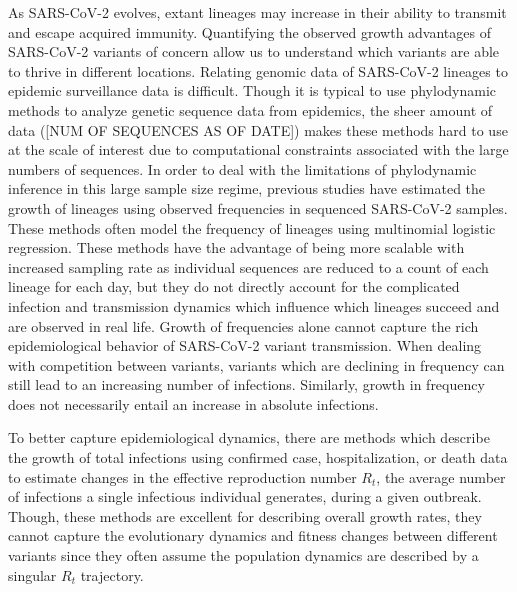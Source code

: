 \documentclass[12pt]{article}
\begin{document}
As SARS-CoV-2 evolves, extant lineages may increase in their ability to transmit and escape acquired immunity. %
Quantifying the observed growth advantages of SARS-CoV-2 variants of concern allow us to understand which variants are able to thrive in different locations.
Relating genomic data of SARS-CoV-2 lineages to epidemic surveillance data is difficult.
Though it is typical to use phylodynamic methods to analyze genetic sequence data from epidemics, the sheer amount of data ([NUM OF SEQUENCES AS OF DATE]) makes these methods hard to use at the scale of interest due to computational constraints associated with the large numbers of sequences.
In order to deal with the limitations of phylodynamic inference in this large sample size regime, previous studies have estimated the growth of lineages using observed frequencies in sequenced SARS-CoV-2 samples. %
These methods often model the frequency of lineages using multinomial logistic regression. \cite{Ito2021}
These methods have the advantage of being more scalable with increased sampling rate as individual sequences are reduced to a count of each lineage for each day, but they do not directly account for the complicated infection and transmission dynamics which influence which lineages succeed and are observed in real life.
Growth of frequencies alone cannot capture the rich epidemiological behavior of SARS-CoV-2 variant transmission.
When dealing with competition between variants, variants which are declining in frequency can still lead to an increasing number of infections.
Similarly, growth in frequency does not necessarily entail an increase in absolute infections.

To better capture epidemiological dynamics, there are methods which describe the growth of total infections using confirmed case, hospitalization, or death data to estimate changes in the effective reproduction number $R_{t}$, the average number of infections a single infectious individual generates, during a given outbreak.
Though, these methods are excellent for describing overall growth rates, they cannot capture the evolutionary dynamics and fitness changes between different variants since they often assume the population dynamics are described by a singular $R_{t}$ trajectory. \cites{Cori2013, Abbott2020} %
\end{document}
